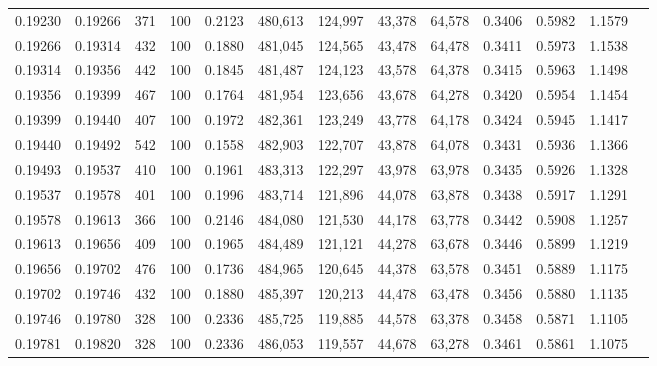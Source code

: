 \begin{tabular}{rrrrrrrrrrrrr}
0.19230 & 0.19266 &   371 & 100 &                                     0.2123 & 480,613 & 124,997 &  43,378 &  64,578 & 0.3406 & 0.5982 & 1.1579 \\
0.19266 & 0.19314 &   432 & 100 &                                     0.1880 & 481,045 & 124,565 &  43,478 &  64,478 & 0.3411 & 0.5973 & 1.1538 \\
0.19314 & 0.19356 &   442 & 100 &                                     0.1845 & 481,487 & 124,123 &  43,578 &  64,378 & 0.3415 & 0.5963 & 1.1498 \\
0.19356 & 0.19399 &   467 & 100 &                                     0.1764 & 481,954 & 123,656 &  43,678 &  64,278 & 0.3420 & 0.5954 & 1.1454 \\
0.19399 & 0.19440 &   407 & 100 &                                     0.1972 & 482,361 & 123,249 &  43,778 &  64,178 & 0.3424 & 0.5945 & 1.1417 \\
0.19440 & 0.19492 &   542 & 100 &                                     0.1558 & 482,903 & 122,707 &  43,878 &  64,078 & 0.3431 & 0.5936 & 1.1366 \\
0.19493 & 0.19537 &   410 & 100 &                                     0.1961 & 483,313 & 122,297 &  43,978 &  63,978 & 0.3435 & 0.5926 & 1.1328 \\
0.19537 & 0.19578 &   401 & 100 &                                     0.1996 & 483,714 & 121,896 &  44,078 &  63,878 & 0.3438 & 0.5917 & 1.1291 \\
0.19578 & 0.19613 &   366 & 100 &                                     0.2146 & 484,080 & 121,530 &  44,178 &  63,778 & 0.3442 & 0.5908 & 1.1257 \\
0.19613 & 0.19656 &   409 & 100 &                                     0.1965 & 484,489 & 121,121 &  44,278 &  63,678 & 0.3446 & 0.5899 & 1.1219 \\
0.19656 & 0.19702 &   476 & 100 &                                     0.1736 & 484,965 & 120,645 &  44,378 &  63,578 & 0.3451 & 0.5889 & 1.1175 \\
0.19702 & 0.19746 &   432 & 100 &                                     0.1880 & 485,397 & 120,213 &  44,478 &  63,478 & 0.3456 & 0.5880 & 1.1135 \\
0.19746 & 0.19780 &   328 & 100 &                                     0.2336 & 485,725 & 119,885 &  44,578 &  63,378 & 0.3458 & 0.5871 & 1.1105 \\
0.19781 & 0.19820 &   328 & 100 &                                     0.2336 & 486,053 & 119,557 &  44,678 &  63,278 & 0.3461 & 0.5861 & 1.1075 \\

\end{tabular}
